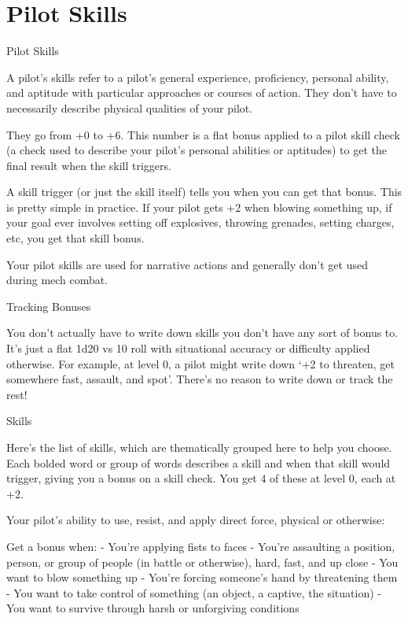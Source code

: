 \section{Pilot Skills}

                                                   Pilot Skills

A pilot’s skills refer to a pilot’s general experience, proficiency, personal ability, and aptitude with
particular approaches or courses of action. They don’t have to necessarily describe physical
qualities of your pilot.

They go from +0 to +6. This number is a flat bonus applied to a pilot skill check (a check used to
describe your pilot’s personal abilities or aptitudes) to get the final result when the skill triggers.

A skill trigger (or just the skill itself) tells you when you can get that bonus. This is pretty simple in
practice. If your pilot gets +2 when blowing something up, if your goal ever involves setting off
explosives, throwing grenades, setting charges, etc, you get that skill bonus.

Your pilot skills are used for narrative actions and generally don’t get used during mech combat.

                                                Tracking Bonuses


You don’t actually have to write down skills you don’t have any sort of bonus to. It’s just a flat
1d20 vs 10 roll with situational accuracy or difficulty applied otherwise. For example, at level 0, a
pilot might write down ‘+2 to threaten, get somewhere fast, assault, and spot’. There’s no reason
to write down or track the rest!


                                                        Skills

Here’s the list of skills, which are thematically grouped here to help you choose. Each bolded
word or group of words describes a skill and when that skill would trigger, giving you a bonus on a
skill check. You get 4 of these at level 0, each at +2.

Your pilot’s ability to use, resist, and apply direct force, physical or otherwise:

Get a bonus when:
          - You’re applying fists to faces
          - You’re assaulting a position, person, or group of people (in battle or otherwise), hard,
         fast, and up close
          - You want to blow something up
          - You’re forcing someone’s hand by threatening them
          - You want to take control of something (an object, a captive, the situation)
          - You want to survive through harsh or unforgiving conditions

